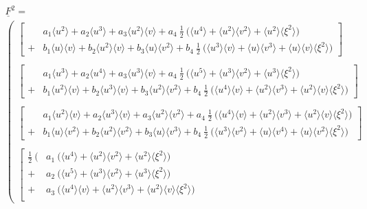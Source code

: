 \documentclass[
	pdftex,             %
	12pt,				%
	a4paper,		   	%
	english,				%
	oneside,			%
]{article}
\newcommand{\mom}[1]{\langle #1 \rangle}
\newcommand{\uu}[1]{\underline{#1}}
\begin{document}
~\\

\begin{math}
\begin{array}{l}
\uu{F}^2 
=
\\
\left(
\begin{array}{l}
\left[
\begin{array}{ll}
  & a_1 \mom{u^2} + 
    a_2 \mom{u^3} +
    a_3 \mom{u^2}\mom{v} +
    a_4 ~\tfrac{1}{2}~\big( \mom{u^4} + \mom{u^2}\mom{v^2} + \mom{u^2}\mom{\xi^2} \big)
\\	
+ & b_1 \mom{u}\mom{v} +
b_2 \mom{u^2}\mom{v} +
b_3 \mom{u}\mom{v^2} +
b_4 ~\tfrac{1}{2}~\big( \mom{u^3}\mom{v} + \mom{u}\mom{v^3} + \mom{u}\mom{v}\mom{\xi^2} \big)
\end{array}
\right]
\\ ~\\
\left[
\begin{array}{ll}
&
a_1 \mom{u^3} +
a_2 \mom{u^4} +
a_3 \mom{u^3}\mom{v} +
a_4 ~\tfrac{1}{2}~\big( \mom{u^5} + \mom{u^3}\mom{v^2} + \mom{u^3}\mom{\xi^2} \big)
\\	
+&
b_1 \mom{u^2}\mom{v} +
b_2 \mom{u^3}\mom{v}+
b_3 \mom{u^2}\mom{v^2}+
b_4 ~\tfrac{1}{2}~\big( \mom{u^4}\mom{v} + \mom{u^2}\mom{v^3} + \mom{u^2}\mom{v}\mom{\xi^2} \big)
\end{array}
\right]
\\ ~ \\
\left[
\begin{array}{ll}
&
a_1 \mom{u^2}\mom{v} +
a_2 \mom{u^3}\mom{v} +
a_3 \mom{u^2}\mom{v^2} +
a_4 ~\tfrac{1}{2}~\big( \mom{u^4}\mom{v} + \mom{u^2}\mom{v^3} + \mom{u^2}\mom{v}\mom{\xi^2} \big)
\\	
+ &
b_1 \mom{u}\mom{v^2} +
b_2 \mom{u^2}\mom{v^2}+
b_3 \mom{u}\mom{v^3}+
b_4 ~\tfrac{1}{2}~\big( \mom{u^3}\mom{v^2} + \mom{u}\mom{v^4} + \mom{u}\mom{v^2}\mom{\xi^2} \big)
\end{array}
\right]
\\ ~ \\
\left[
\begin{array}{ll}
\frac{1}{2} ~ \Big( 
   & a_1~ \big( \mom{u^4} + \mom{u^2}\mom{v^2} + \mom{u^2}\mom{\xi^2} \big) \\
 + & a_2~ \big( \mom{u^5} + \mom{u^3}\mom{v^2} + \mom{u^3}\mom{\xi^2} \big) \\
 + & a_3~ \big( \mom{u^4}\mom{v} + \mom{u^2}\mom{v^3} + \mom{u^2}\mom{v}\mom{\xi^2} \big) \\

\end{array}
\end{array}
\end{array}
\end{math}
\end{document}
